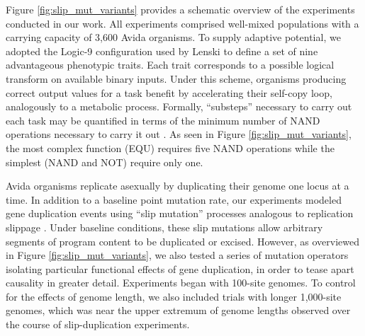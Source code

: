 Figure \ref{fig:slip_mut_variants} provides a schematic overview of the experiments conducted in our work.
All experiments comprised well-mixed populations with a carrying capacity of 3,600 Avida organisms.
To supply adaptive potential, we adopted the Logic-9 configuration used by Lenski \citet{lenski2003evolutionary} to define a set of nine advantageous phenotypic traits.
Each trait corresponds to a possible logical transform on available binary inputs.
Under this scheme, organisms producing correct output values for a task benefit by accelerating their self-copy loop, analogously to a metabolic process.
Formally, ``substeps'' necessary to carry out each task may be quantified in terms of the minimum number of NAND operations necessary to carry it out \citep{lenski2003evolutionary}.
As seen in Figure \ref{fig:slip_mut_variants}, the most complex function (EQU) requires five NAND operations while the simplest (NAND and NOT) require only one.

Avida organisms replicate asexually by duplicating their genome one locus at a time.
In addition to a baseline point mutation rate, our experiments
modeled gene duplication events using ``slip mutation'' processes analogous to replication slippage \citep{bzymek_instability_2001}.
Under baseline conditions, these slip mutations allow arbitrary segments of program content to be duplicated or excised.
However, as overviewed in Figure \ref{fig:slip_mut_variants}, we also tested a series of mutation operators isolating particular functional effects of gene duplication, in order to tease apart causality in greater detail.
Experiments began with 100-site genomes.
To control for the effects of genome length, we also included trials with longer 1,000-site genomes, which was near the upper extremum of genome lengths observed over the course of slip-duplication experiments.

